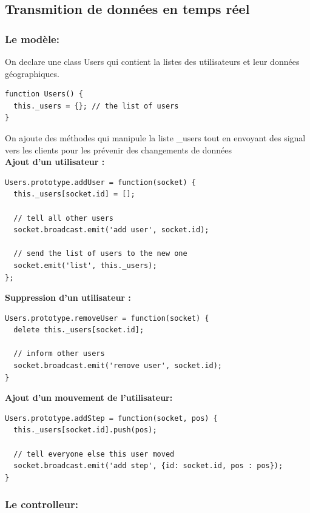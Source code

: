 \documentclass[a4paper]{article}
\begin{document}
\subsection{Transmition de données en temps réel}


\subsubsection{Le modèle:}

On declare une class Users qui contient la listes des utilisateurs
et leur données géographiques.

\begin{lstlisting}
function Users() {
  this._users = {}; // the list of users
}
\end{lstlisting}

On ajoute des méthodes qui manipule la liste \_users tout en envoyant des signal 
vers les clients pour les prévenir des changements de données\\

\textbf{Ajout d'un utilisateur : }

\begin{lstlisting}
Users.prototype.addUser = function(socket) {
  this._users[socket.id] = [];

  // tell all other users
  socket.broadcast.emit('add user', socket.id);

  // send the list of users to the new one
  socket.emit('list', this._users);
};
\end{lstlisting}

\textbf{Suppression d'un utilisateur : }
\begin{lstlisting}
Users.prototype.removeUser = function(socket) {
  delete this._users[socket.id];

  // inform other users
  socket.broadcast.emit('remove user', socket.id);
}
\end{lstlisting}

\textbf{Ajout d'un mouvement de l'utilisateur:}
\begin{lstlisting}
Users.prototype.addStep = function(socket, pos) {
  this._users[socket.id].push(pos);

  // tell everyone else this user moved 
  socket.broadcast.emit('add step', {id: socket.id, pos : pos});
}
\end{lstlisting}

\subsubsection{Le controlleur:}
\end{document}
